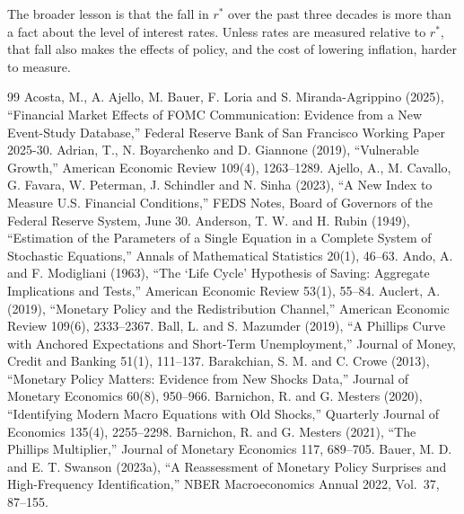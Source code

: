 \documentclass[11pt]{article}
\newcommand{\rs}{r^{*}}
\begin{document}
The broader lesson is that the fall in $\rs$ over the past three decades is more than a fact about the level of interest rates. Unless rates are measured relative to $\rs$, that fall also makes the effects of policy, and the cost of lowering inflation, harder to measure.

\begin{thebibliography}{99}\small
{} Acosta, M., A. Ajello, M. Bauer, F. Loria and S. Miranda-Agrippino (2025), ``Financial Market Effects of FOMC Communication: Evidence from a New Event-Study Database,'' Federal Reserve Bank of San Francisco Working Paper 2025-30.
 Adrian, T., N. Boyarchenko and D. Giannone (2019), ``Vulnerable Growth,'' American Economic Review 109(4), 1263--1289.
 Ajello, A., M. Cavallo, G. Favara, W. Peterman, J. Schindler and N. Sinha (2023), ``A New Index to Measure U.S. Financial Conditions,'' FEDS Notes, Board of Governors of the Federal Reserve System, June 30.
 Anderson, T. W. and H. Rubin (1949), ``Estimation of the Parameters of a Single Equation in a Complete System of Stochastic Equations,'' Annals of Mathematical Statistics 20(1), 46--63.
 Ando, A. and F. Modigliani (1963), ``The `Life Cycle' Hypothesis of Saving: Aggregate Implications and Tests,'' American Economic Review 53(1), 55--84.
 Auclert, A. (2019), ``Monetary Policy and the Redistribution Channel,'' American Economic Review 109(6), 2333--2367.
 Ball, L. and S. Mazumder (2019), ``A Phillips Curve with Anchored Expectations and Short-Term Unemployment,'' Journal of Money, Credit and Banking 51(1), 111--137.
 Barakchian, S. M. and C. Crowe (2013), ``Monetary Policy Matters: Evidence from New Shocks Data,'' Journal of Monetary Economics 60(8), 950--966.
 Barnichon, R. and G. Mesters (2020), ``Identifying Modern Macro Equations with Old Shocks,'' Quarterly Journal of Economics 135(4), 2255--2298.
 Barnichon, R. and G. Mesters (2021), ``The Phillips Multiplier,'' Journal of Monetary Economics 117, 689--705.
 Bauer, M. D. and E. T. Swanson (2023a), ``A Reassessment of Monetary Policy Surprises and High-Frequency Identification,'' NBER Macroeconomics Annual 2022, Vol.\ 37, 87--155.

\end{thebibliography}
\end{document}
